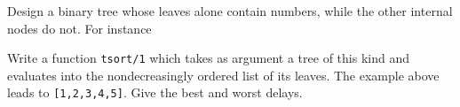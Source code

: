 \documentclass[11pt,a4paper]{article}
\author{Christian Rinderknecht}
\date{10 December 2009}
\newcommand\erlcode[1]{\texttt{#1}}
\begin{document}
\maketitle

\thispagestyle{empty}

Design a binary tree whose leaves alone contain numbers, while the
other internal nodes do not. For instance
\begin{center}
\end{center}
Write a function \erlcode{tsort/1} which takes as argument a tree of
this kind and evaluates into the nondecreasingly ordered list of its
leaves. The example above leads to \erlcode{[1,2,3,4,5]}. Give the
best and worst delays.
\end{document}
